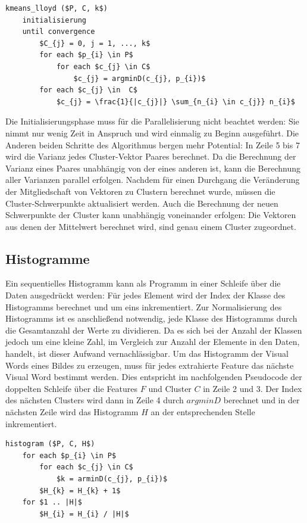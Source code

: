 \lstset{language=C}
\begin{lstlisting}[mathescape=true]
kmeans_lloyd ($P, C, k$)
	initialisierung
	until convergence
		$C_{j} = 0, j = 1, ..., k$
		for each $p_{i} \in P$
			for each $c_{j} \in C$
				$c_{j} = argminD(c_{j}, p_{i})$		
		for each $c_{j} \in  C$
			$c_{j} = \frac{1}{|c_{j}|} \sum_{n_{i} \in c_{j}} n_{i}$
\end{lstlisting}

Die Initialisierungsphase muss für die Parallelisierung nicht beachtet werden: Sie nimmt nur wenig Zeit in Anspruch und wird einmalig zu Beginn ausgeführt. Die Anderen beiden Schritte des Algorithmus bergen mehr Potential: In Zeile 5 bis 7 wird die Varianz jedes Cluster-Vektor Paares berechnet. Da die Berechnung der Varianz eines Paares unabhängig von der eines anderen ist, kann die Berechnung aller Varianzen parallel erfolgen. Nachdem für einen Durchgang die Veränderung der Mitgliedschaft von Vektoren zu Clustern berechnet wurde, müssen die Cluster-Schwerpunkte aktualisiert werden. Auch die Berechnung der neuen Schwerpunkte der Cluster kann unabhängig voneinander erfolgen: Die Vektoren aus denen der Mittelwert berechnet wird, sind genau einem Cluster zugeordnet.


\subsection{Histogramme}

Ein sequentielles Histogramm kann als Programm in einer Schleife über die Daten ausgedrückt werden: Für jedes Element wird der Index der Klasse des Histogramms berechnet und um eins inkrementiert. Zur Normalisierung des Histogramms ist es anschließend notwendig, jede Klasse des Histogramms durch die Gesamtanzahl der Werte zu dividieren. Da es sich bei der Anzahl der Klassen jedoch um eine kleine Zahl, im Vergleich zur Anzahl der Elemente in den Daten, handelt, ist dieser Aufwand vernachlässigbar.
Um das Histogramm der Visual Words eines Bildes zu erzeugen, muss für jedes extrahierte Feature das nächste Visual Word bestimmt werden. Dies entspricht im nachfolgenden Pseudocode der doppelten Schleife über die Features $F$ und Cluster $C$ in Zeile 2 und 3. Der Index des nächsten Clusters wird dann in Zeile 4 durch $argmin D$ berechnet und in der nächsten Zeile wird das Histogramm $H$ an der entsprechenden Stelle inkrementiert.

\begin{lstlisting}[mathescape=true]
histogram ($P, C, H$)
	for each $p_{i} \in P$
		for each $c_{j} \in C$
			$k = arminD(c_{j}, p_{i})$ 
		$H_{k} = H_{k} + 1$		
	for $1 .. |H|$
		$H_{i} = H_{i} / |H|$
\end{lstlisting}

